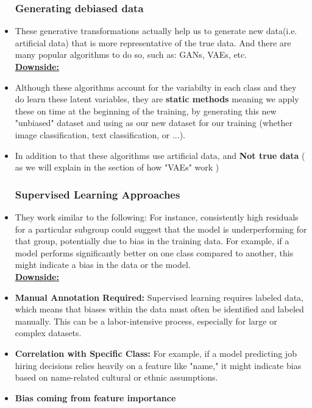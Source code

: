 \documentclass{article}
\begin{document}
\begin{itemize}
\subsubsection{Generating debiased data}
\item These generative transformations actually help us to generate new data(i.e. artificial data) that is more representative of the true data. And there are many popular algorithms to do so, such as: GANs, VAEs, etc.\\
\textbf{\underline{Downside:}}
\item Although these algorithms account for the variabilty in each class and they do learn these latent variables, they are \textbf{static methods} meaning we apply these on time at the beginning of the training, by generating this new "unbiased" dataset and using as our new dataset for our training (whether image classification, text classification, or ...).
\item In addition to that these algorithms use artificial data, and \textbf{Not true data} ( as we will explain in the section of how "VAEs" work )
\subsubsection{Supervised Learning Approaches}
\item They work similar to the following: For instance, consistently high residuals for a particular subgroup could suggest that the model is underperforming for that group, potentially due to bias in the training data. For example, if a model performs significantly better on one class compared to another, this might indicate a bias in the data or the model.\\
\textbf{\underline{Downside:}}
\item \textbf{Manual Annotation Required:} Supervised learning requires labeled data, which means that biases within the data must often be identified and labeled manually. This can be a labor-intensive process, especially for large or complex datasets.
\item \textbf{Correlation with Specific Class: }For example, if a model predicting job hiring decisions relies heavily on a feature like "name," it might indicate bias based on name-related cultural or ethnic assumptions.
\item \textbf{Bias coming from feature importance}

\end{itemize}
\end{document}
